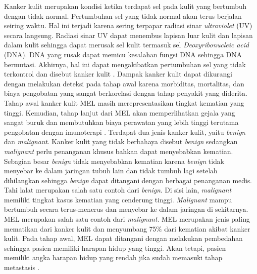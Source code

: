     Kanker kulit merupakan kondisi ketika terdapat sel pada kulit yang bertumbuh dengan tidak normal. Pertumbuhan sel yang tidak normal akan terus berjalan seiring waktu. Hal ini terjadi karena sering terpapar radiasi sinar \textit{ultraviolet} (UV) secara langsung. Radiasi sinar UV dapat menembus lapisan luar kulit dan lapisan dalam kulit sehingga dapat merusak sel kulit termasuk sel \textit{Deoxyribonucleic acid} (DNA). DNA yang rusak dapat memicu kesalahan fungsi DNA sehingga DNA bermutasi. Akhirnya, hal ini dapat mengakibatkan pertumbuhan sel yang tidak terkontrol dan disebut kanker kulit \citep{Bhimavarapu2022}. Dampak kanker kulit dapat dikurangi dengan melakukan deteksi pada tahap awal karena morbiditas, mortalitas, dan biaya pengobatan yang sangat berkorelasi dengan tahap penyakit yang diderita. Tahap awal kanker kulit MEL masih merepresentasikan tingkat kematian yang tinggi. Kemudian, tahap lanjut dari MEL akan memperlihatkan gejala yang sangat buruk dan membutuhkan biaya perawatan yang lebih tinggi terutama pengobatan dengan imunoterapi \citep{Janda2022}. Terdapat dua jenis kanker kulit, yaitu \textit{benign} dan \textit{malignant}. Kanker kulit yang tidak berbahaya disebut \textit{benign} sedangkan \textit{malignant} perlu penanganan khusus bahkan dapat menyebabkan kematian. Sebagian besar \textit{benign} tidak menyebabkan kematian karena \textit{benign} tidak menyebar ke dalam jaringan tubuh lain dan tidak tumbuh lagi setelah dihilangkan sehingga \textit{benign} dapat ditangani dengan berbagai penanganan medis. Tahi lalat merupakan salah satu contoh dari \textit{benign}. Di sisi lain, \textit{malignant} memiliki tingkat kasus kematian yang cenderung tinggi. \textit{Malignant} mampu bertumbuh secara terus-menerus dan menyebar ke dalam jaringan di sekitarnya. MEL merupakan salah satu contoh dari \textit{malignant}. MEL merupakan jenis paling mematikan dari kanker kulit dan menyumbang 75\% dari kematian akibat kanker kulit. Pada tahap awal, MEL dapat ditangani dengan melakukan pembedahan sehingga pasien memiliki harapan hidup yang tinggi. Akan tetapi, pasien memiliki angka harapan hidup yang rendah jika sudah memasuki tahap metastasis \citep{Davis2019}.

